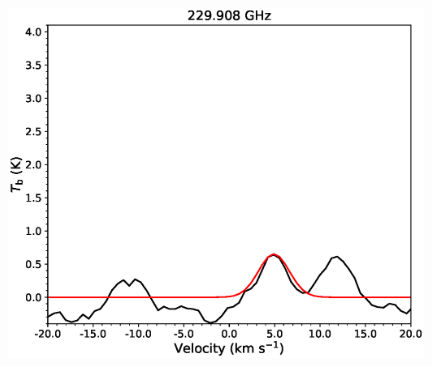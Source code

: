 \begin{figure}[H]
\begin{center}
\begin{minipage}{0.98\textwidth}
\begin{center}
\begin{minipage}{0.48\textwidth}
\begin{center}
\end{center}
\end{minipage}
\begin{minipage}{0.48\textwidth}
\begin{center}
\includegraphics[width=0.98\textwidth]{OrionKL/spectrum/HC/229.908118w_fit.eps}
\end{center}
\end{minipage}
\end{center}
\end{minipage}


\end{center}
\end{figure}
